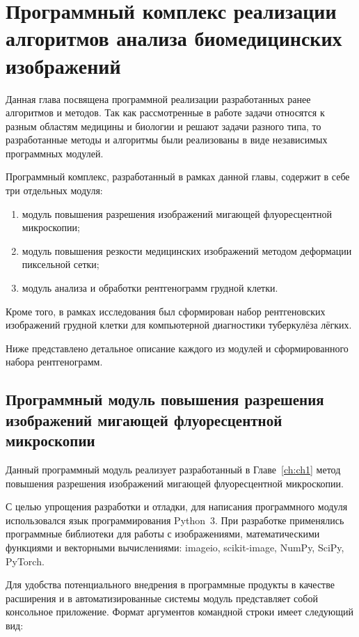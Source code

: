 \chapter{Программный комплекс реализации алгоритмов анализа биомедицинских изображений}\label{ch:ch4}

Данная глава посвящена программной реализации разработанных ранее алгоритмов и методов. Так как рассмотренные в работе задачи относятся к разным областям медицины и биологии и решают задачи разного типа, то разработанные методы и алгоритмы были реализованы в виде независимых программных модулей.

Программный комплекс, разработанный в рамках данной главы, содержит в себе три отдельных модуля:
\begin{enumerate}[beginpenalty=10000]
	\item модуль повышения разрешения изображений мигающей флуоресцентной микроскопии;
	
	\item модуль повышения резкости медицинских изображений методом деформации пиксельной сетки;
	
	\item модуль анализа и обработки рентгенограмм грудной клетки.
\end{enumerate}

Кроме того, в рамках исследования был сформирован набор рентгеновских изображений грудной клетки для компьютерной диагностики туберкулёза лёгких.

Ниже представлено детальное описание каждого из модулей и сформированного набора рентгенограмм.
 
\section{Программный модуль повышения разрешения изображений мигающей флуоресцентной микроскопии}

Данный программный модуль реализует разработанный в Главе~\ref{ch:ch1} метод повышения разрешения изображений мигающей флуоресцентной микроскопии.

С целью упрощения разработки и отладки, для написания программного модуля использовался язык программирования Python~3. При разработке применялись программные библиотеки для работы с изображениями, математическими функциями и векторными вычислениями: imageio, scikit-image, NumPy, SciPy, PyTorch.

Для удобства потенциального внедрения в программные продукты в качестве расширения и в автоматизированные системы модуль представляет собой консольное приложение. Формат аргументов командной строки имеет следующий вид:

